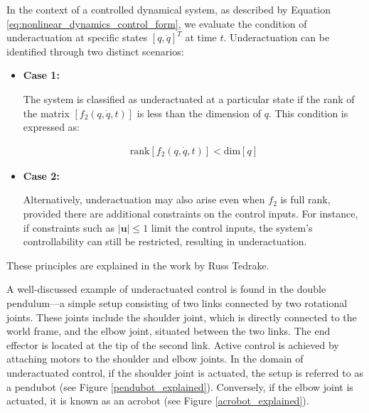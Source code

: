 In the context of a controlled dynamical system, as described by Equation \ref{eq:nonlinear_dynamics_control_form}, we evaluate the condition of underactuation at specific states \([q, \dot{q}]^T\) at time \(t\). Underactuation can be identified through two distinct scenarios:

\begin{itemize}
 \item \textbf{Case 1:}
 
 The system is classified as underactuated at a particular state if the rank of the matrix \([f_2(q, \dot{q}, t)]\) is less than the dimension of \(q\). This condition is expressed as:
 
 \begin{align}
    \text{rank}[f_2(q, \dot{q}, t)] < \text{dim}[q]
\end{align}
 
 \item \textbf{Case 2:} 
 
 Alternatively, underactuation may also arise even when \(f_2\) is full rank, provided there are additional constraints on the control inputs. For instance, if constraints such as \(|\mathbf{u}| \leq 1\) limit the control inputs, the system's controllability can still be restricted, resulting in underactuation.
\end{itemize}

These principles are explained in the work by Russ Tedrake\cite{tedrake2022underactuated}.

A well-discussed example of underactuated control is found in the double pendulum—a simple setup consisting of two links connected by two rotational joints. These joints include the shoulder joint, which is directly connected to the world frame, and the elbow joint, situated between the two links. The end effector is located at the tip of the second link. Active control is achieved by attaching motors to the shoulder and elbow joints. In the domain of underactuated control, if the shoulder joint is actuated, the setup is referred to as a pendubot (see Figure \ref{pendubot_explained}). Conversely, if the elbow joint is actuated, it is known as an acrobot (see Figure \ref{acrobot_explained}).

